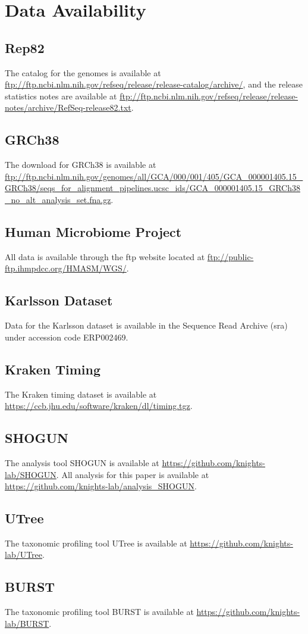 \section{Data Availability}

\subsection{Rep82}
The catalog for the genomes is available at \url{ftp://ftp.ncbi.nlm.nih.gov/refseq/release/release-catalog/archive/}, and the release statistics notes are available at \url{ftp://ftp.ncbi.nlm.nih.gov/refseq/release/release-notes/archive/RefSeq-release82.txt}.

\subsection{GRCh38}
The download for GRCh38 is available at \url{ftp://ftp.ncbi.nlm.nih.gov/genomes/all/GCA/000/001/405/GCA_000001405.15_GRCh38/seqs_for_alignment_pipelines.ucsc_ids/GCA_000001405.15_GRCh38_no_alt_analysis_set.fna.gz}.

\subsection{Human Microbiome Project}
All data is available through the ftp website located at \url{ftp://public-ftp.ihmpdcc.org/HMASM/WGS/}.

\subsection{Karlsson Dataset}
Data for the Karlsson dataset is available in the Sequence Read Archive (sra) under accession code ERP002469.

\subsection{Kraken Timing}
The Kraken timing dataset is available at \url{https://ccb.jhu.edu/software/kraken/dl/timing.tgz}.

\subsection{SHOGUN}
The analysis tool SHOGUN is available at \url{https://github.com/knights-lab/SHOGUN}. All analysis for this paper is available at \url{https://github.com/knights-lab/analysis_SHOGUN}.

\subsection{UTree}
The taxonomic profiling tool UTree is available at \url{https://github.com/knights-lab/UTree}.

\subsection{BURST}
The taxonomic profiling tool BURST is available at \url{https://github.com/knights-lab/BURST}.
